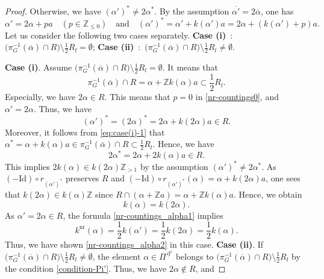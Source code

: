 \documentclass[11pt]{amsart}
\newcommand{\Z}{\mathbb{Z}}
\newcommand{\dc}{\,\underline{\mathrm{d}}^c}
\begin{document}
{\begin{proof}
Otherwise, we have $(\alpha')^*\ne 2\alpha^\ast$. By the
assumption $\overline{\alpha'}= 2\overline{\alpha}$, one has
\begin{equation}\label{nr-countings0}
\alpha'=2\alpha+pa\quad (p\in \Z_{\leq 0})\quad\text{and}\quad
(\alpha')^\ast=\alpha'+k(\alpha')a=2\alpha+(k(\alpha')+p)a.
\end{equation}
Let us consider the following two cases separately.
\vskip 1mm
{\bf Case (i)}\, :\, $\big(\pi_G^{-1}(\overline{\alpha})\cap R\big) \setminus \frac12 R_l=\emptyset$;
\vskip 1mm
{\bf Case (ii)}\, :\, $\big(\pi_G^{-1}(\overline{\alpha})\cap R\big) \setminus \frac12 R_l\ne \emptyset$.
 
\vskip 3mm
\noindent
{\bf Case (i)}. 
Assume $\big(\pi_G^{-1}(\overline{\alpha})\cap R\big)\setminus \frac12 R_l=\emptyset$. It means
that 
\begin{equation}\label{eq:case(i)-1}
\pi_G^{-1}(\overline{\alpha})\cap R=\alpha+\Z k(\alpha)a\subset \frac12 R_l. 
\end{equation}
Especially, we have $2\alpha\in R$. This means that $p=0$ in \eqref{nr-countings0},
and $\alpha'=2\alpha$. Thus, we have
\begin{equation}\label{nr-countings10}
(\alpha')^\ast=(2\alpha)^{\ast}=2\alpha+k(2\alpha)a\in R.
\end{equation}
Moreover, it follows from \eqref{eq:case(i)-1} that
$\alpha^\ast=\alpha+k(\alpha)a\in \pi_G^{-1}(\overline{\alpha})\cap R
\subset \frac12 R_l$. 
Hence, we have
\[2\alpha^*=2\alpha+2k(\alpha)a\in R.\]
This implies $2k(\alpha) \in k(2\alpha)\Z_{>1}$ by the assumption 
$(\alpha')^\ast \neq 2\alpha^\ast$. As $(-\mathrm{Id})\circ r_{(\alpha')^\ast}$ preserves 
$R$ and $(-\mathrm{Id})\circ r_{(\alpha')^\ast}(\alpha)=\alpha+k(2\alpha)a$, one sees 
that $k(2\alpha) \in k(\alpha)\Z$ since $R \cap (\alpha+\Z a)=\alpha+\Z k(\alpha)a$. 
Hence, we obtain 
\begin{equation}\label{nr-countings11}
k(\alpha)=k(2\alpha).
\end{equation}
As $\alpha'=2\alpha\in R$, the formula \eqref{nr-countings_alpha1} implies
\[k^{\mathrm{nr}}(\alpha)=\frac12 k(\alpha')=\frac12 k(2\alpha)=
\frac12 k(\alpha).\]
Thus, we have shown \eqref{nr-countings_alpha2} in this case.  
\vskip 3mm
\noindent
{\bf Case (ii)}. If $\big(\pi_G^{-1}(\overline{\alpha})\cap R\big) \setminus \frac12 R_l\ne\emptyset$,
the element $\alpha\in \Pi^{\dc}$ belongs to 
$\big(\pi_G^{-1}(\overline{\alpha})\cap R\big) \setminus \frac12 R_l$ by the 
condition \eqref{condition-Pi'}. 
Thus,  we have $2\alpha\not\in R$, and

\end{proof}}
\end{document}
